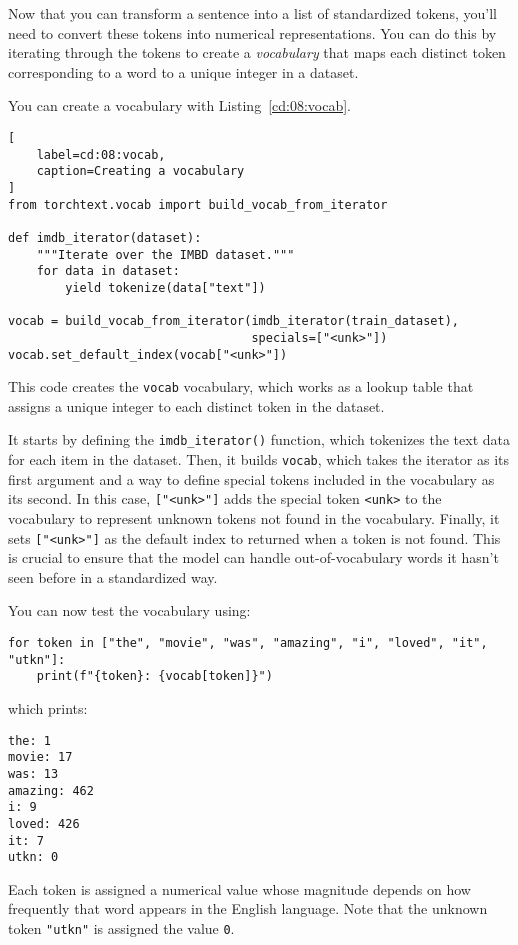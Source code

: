 Now that you can transform a sentence into a list of standardized tokens, you'll need to convert these tokens into numerical representations. You can do this by iterating through the tokens to create a \emph{vocabulary} that maps each distinct token corresponding to a word to a unique integer in a dataset.

You can create a vocabulary with Listing~\ref{cd:08:vocab}.
\begin{lstlisting}[
    label=cd:08:vocab,
    caption=Creating a vocabulary
]
from torchtext.vocab import build_vocab_from_iterator

def imdb_iterator(dataset):
    """Iterate over the IMBD dataset."""
    for data in dataset:
        yield tokenize(data["text"])

vocab = build_vocab_from_iterator(imdb_iterator(train_dataset), 
                                  specials=["<unk>"])
vocab.set_default_index(vocab["<unk>"])
\end{lstlisting}
This code creates the \lstinline{vocab} vocabulary, which works as a lookup table that assigns a unique integer to each distinct token in the dataset. 

It starts by defining the \lstinline{imdb_iterator()} function, which tokenizes the text data for each item in the dataset. 
Then, it builds \lstinline{vocab}, which takes the iterator as its first argument and a way to define special tokens  included in the vocabulary as its second. In this case, \lstinline{["<unk>"]} adds the special token \lstinline{<unk>} to the vocabulary to represent unknown tokens not found in the vocabulary.
Finally, it sets \lstinline{["<unk>"]} as the default index to returned when a token is not found. This is crucial to ensure that the model can handle out-of-vocabulary words it hasn't seen before in a standardized way.

You can now test the vocabulary using:
\begin{lstlisting}
for token in ["the", "movie", "was", "amazing", "i", "loved", "it", "utkn"]:
    print(f"{token}: {vocab[token]}")
\end{lstlisting}
which prints:
\begin{lstlisting}
the: 1
movie: 17
was: 13
amazing: 462
i: 9
loved: 426
it: 7
utkn: 0
\end{lstlisting}
Each token is assigned a numerical value whose magnitude depends on how frequently that word appears in the English language.
Note that the unknown token \lstinline{"utkn"} is assigned the value \lstinline{0}.

